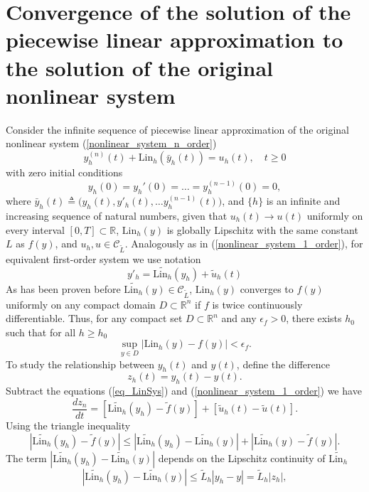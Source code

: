 \documentclass[preprint,12pt]{elsarticle}
\begin{document}
\section[]{Convergence of the solution of the piecewise linear approximation to the solution of the original nonlinear system}
Consider the infinite sequence of piecewise linear approximation of the original nonlinear system (\ref{nonlinear_system_n_order})
\begin{equation}\label{piecewise_linear_system_n_order}
y_h^{(n)}(t) +  \text{Lin}_{h}({\bar y_h(t)}) = {u}_{h}(t),\quad t\geq0
\end{equation}
with zero initial conditions
\[
y_h(0) = y_h'(0) = \dots = y_h^{(n-1)}(0) = 0,
\]
where $\bar y_h(t)\triangleq\big(y_h(t),y'_h(t),\dots y^{(n-1)}_h(t) \big)$, and $\{h \}$ is an infinite and increasing sequence of natural numbers,
given that \( u_{h}(t) \to u(t) \) uniformly on every interval \( [0,T]\subset \mathbb{R}\), $\text{Lin}_{h}({y})$ is globally Lipschitz with the same constant $L$ as $f(y)$, and ${u}_{h}, u\in \mathcal{C}_{\tilde L}$. Analogously as in (\ref{nonlinear_system_1_order}), for equivalent first-order system we use notation
\begin{equation}\label{eq_LinSys}
y'_h=\tilde{\text{Lin}_{h}}({y_h}) + \tilde{u}_{h}(t)
\end{equation}
As has been proven before $\tilde{\text{Lin}_{h}}(y)\in\mathcal{C}_{\tilde L}$, \( \text{Lin}_{h}({y}) \) converges to \( f(y) \) uniformly  on any compact domain $D\subset\mathbb{R}^n$ if $f$ is twice continuously differentiable. 
Thus, for any compact set \( D \subset \mathbb{R}^n \) and any \(\epsilon_f > 0\), there exists \( h_0 \) such that for all \( h \geq h_0 \)
\[
\sup_{y \in D} |\text{Lin}_{h}({y}) - f(y)| < \epsilon_f.
\]
To study the relationship between \( y_h(t) \) and \( y(t) \), define the difference
\[
z_h(t) = y_h(t) - y(t).
\]
Subtract the equations (\ref{eq_LinSys}) and (\ref{nonlinear_system_1_order}) we have
\[
\frac{dz_n}{dt} = \left[\tilde{\text{Lin}_{h}}({y_h}) - \tilde f(y)\right] + \left[\tilde u_h(t) - \tilde u(t)\right].
\]
Using the triangle inequality
\[
|\tilde{\text{Lin}_{h}}({y_h}) - \tilde f(y)| 
\leq |\tilde{\text{Lin}_{h}}({y_h}) - \tilde{\text{Lin}_{h}}({y})| + |\tilde{\text{Lin}_{h}}({y}) - \tilde f(y)|.
\]
The term \( |\tilde{\text{Lin}_{h}}({y_h}) - \tilde{\text{Lin}_{h}}({y})| \) depends on the Lipschitz continuity of \( \tilde{\text{Lin}_{h}} \)
   \[
   |\tilde{\text{Lin}_{h}}({y_h}) - \tilde{\text{Lin}_{h}}({y})| \leq \tilde L_h |y_h - y| = \tilde L_h |z_h|,
   \]
\end{document}
